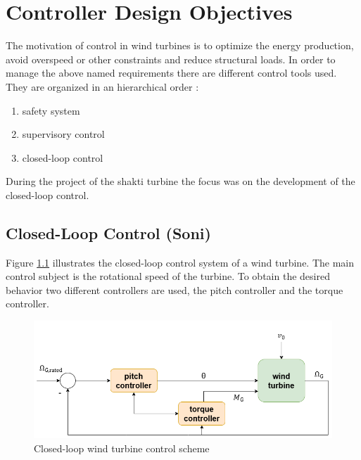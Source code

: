 \chapter{Controller Design Objectives}
The motivation of control in wind turbines is to optimize the energy production, avoid overspeed or other constraints and reduce structural loads. \cite{SchlipfLecture}
In order to manage the above named requirements there are different control tools used.
They are organized in an hierarchical order \cite{WindEnergyHandbook}:
\begin{enumerate} 
	\item safety system
	\item supervisory control
	\item closed-loop control
\end{enumerate} 
During the project of the \gls{shakti} turbine the focus was on the development of the closed-loop control.
\section{Closed-Loop Control (Soni)} \label{Advanced controller}
Figure \ref{fig:Closed-loop Wind Turbine Control} illustrates the closed-loop control system of a wind turbine.
The main control subject is the rotational speed of the turbine.
To obtain the desired behavior two different controllers are used, the pitch controller and the torque controller.

\begin{figure}[h]
	\centering
	\includegraphics[width=\textwidth]{Figures/Figure_1.png}
	\caption{Closed-loop wind turbine control scheme}
	\label{fig:Closed-loop Wind Turbine Control}
\end{figure}

